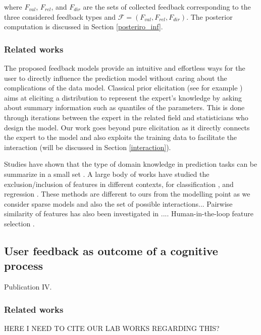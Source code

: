 \documentclass[dissertation,math,vertlayout,pdfa,colorlinks]{aaltoseries}
\newcommand{\bF}{\mathcal{F}}
\begin{document}
\noindent where $F_{val}$, $F_{rel}$, and $F_{dir}$ are the sets of collected feedback corresponding to the three considered feedback types and $\bF = (F_{val}, F_{rel}, F_{dir})$. The posterior computation is discussed in Section \ref{posteriro_inf}.




\subsubsection{Related works}

The proposed feedback models provide an intuitive and effortless ways for the user to directly influence the prediction model without caring about the complications of the data model. Classical prior elicitation (see for example \cite{OHagan06,garthwaite2005statistical}) aims at eliciting a distribution to represent the expert's knowledge by asking about summary information such as quantiles of the parameters. This is done through iterations between the expert in the related field and statisticians who design the model. Our work goes beyond pure elicitation as it directly connects the expert to the model and also exploits the training data to facilitate the interaction (will be discussed in Section \ref{interaction}).

Studies have shown that the type of domain knowledge in prediction tasks can be summarize in a small set \cite{concept_driven_CHI2019}. A large body of works have studied the exclusion/inclusion of features in different contexts, for classification  \cite{raghavan2006active,druck2009active,settles2011closing}, and regression \cite{Micallef_elicitation}. These methods are different to ours from the modelling point as we consider sparse models and also the set of possible interactions...
Pairwise similarity of features has also been investigated in \cite{Homayun_pairwise_UMAP,Homayun_pairwise_ijcai2019}....  Human-in-the-loop feature selection \cite{Correia2019HumanintheLoopFS}.  

\subsection{User feedback as outcome of a cognitive process}
Publication IV.


\subsubsection{Related works}
HERE I NEED TO CITE OUR LAB WORKS REGARDING THIS?
\end{document}
